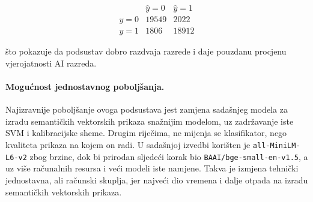 \[
\begin{array}{c|cc}
 & \hat y=0 & \hat y=1 \\
\hline
y=0 & 19549 & 2022 \\
y=1 & 1806 & 18912
\end{array}
\]

što pokazuje da podsustav dobro razdvaja razrede i daje pouzdanu procjenu vjerojatnosti AI razreda.

\paragraph{Mogućnost jednostavnog poboljšanja.}
Najizravnije poboljšanje ovoga podsustava jest zamjena sadašnjeg modela za izradu semantičkih vektorskih prikaza snažnijim modelom, uz zadržavanje iste SVM i kalibracijske sheme. Drugim riječima, ne mijenja se klasifikator, nego kvaliteta prikaza na kojem on radi. U sadašnjoj izvedbi korišten je \texttt{all-MiniLM-L6-v2} zbog brzine, dok bi prirodan sljedeći korak bio \texttt{BAAI/bge-small-en-v1.5}, a uz više računalnih resursa i veći modeli iste namjene. Takva je izmjena tehnički jednostavna, ali računski skuplja, jer najveći dio vremena i dalje otpada na izradu semantičkih vektorskih prikaza.